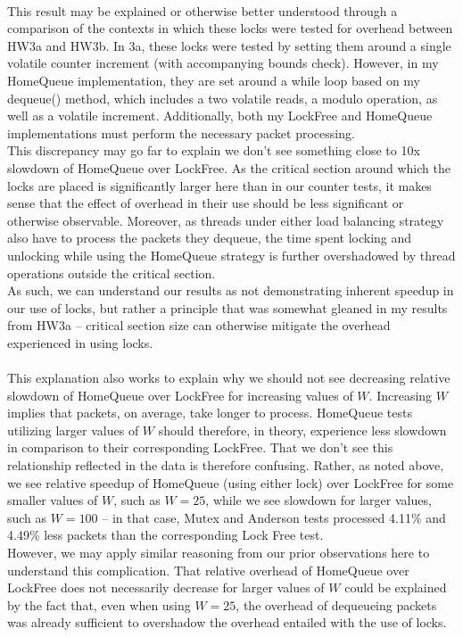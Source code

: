 \documentclass[]{article}
\begin{document}
\\
This result may be explained or otherwise better understood through a comparison of the contexts in which these locks were tested for overhead between HW3a and HW3b. In 3a, these locks were tested by setting them around a single volatile counter increment (with accompanying bounds check). However, in my HomeQueue implementation, they are set around a while loop based on my dequeue() method, which includes a two volatile reads, a modulo operation, as well as a volatile increment. Additionally, both my LockFree and HomeQueue implementations must perform the necessary packet processing.
\\
This discrepancy may go far to explain we don't see something close to 10x slowdown of HomeQueue over LockFree. As the critical section around which the locks are placed is significantly larger here than in our counter tests, it makes sense that the effect of overhead in their use should be less significant or otherwise observable. Moreover, as threads under either load balancing strategy also have to process the packets they dequeue, the time spent locking and unlocking while using the HomeQueue strategy is further overshadowed by thread operations outside the critical section.
\\
As such, we can understand our results as not demonstrating inherent speedup in our use of locks, but rather a principle that was somewhat gleaned in my results from HW3a -- critical section size can otherwise mitigate the overhead experienced in using locks.
\\\\
This explanation also works to explain why we should not see decreasing relative slowdown of HomeQueue over LockFree for increasing values of $W$. Increasing $W$ implies that packets, on average, take longer to process. HomeQueue tests utilizing larger values of $W$ should therefore, in theory, experience less slowdown in comparison to their corresponding LockFree. That we don't see this relationship reflected in the data is therefore confusing. Rather, as noted above, we see relative speedup of HomeQueue (using either lock) over LockFree for some smaller values of $W$, such as $W = 25$, while we see slowdown for larger values, such as $W = 100$ -- in that case, Mutex and Anderson tests processed 4.11\% and 4.49\% less packets than the corresponding Lock Free test.
\\
However, we may apply similar reasoning from our prior observations here to understand this complication. That relative overhead of HomeQueue over LockFree does not necessarily decrease for larger values of $W$ could be explained by the fact that, even when using $W = 25$, the overhead of dequeueing packets was already sufficient to overshadow the overhead entailed with the use of locks. 
\end{document}
